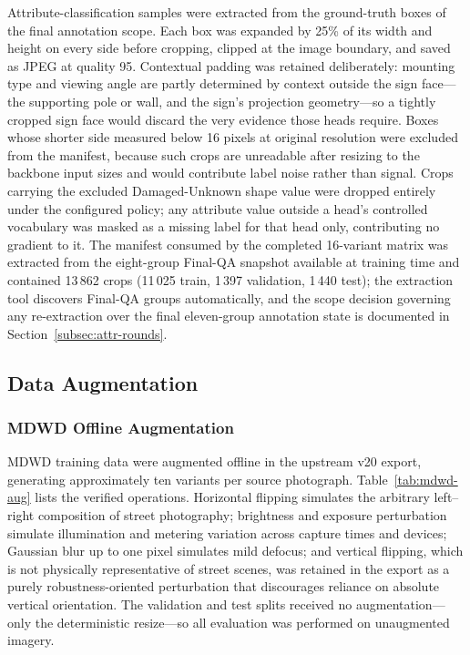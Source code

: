 Attribute-classification samples were extracted from the ground-truth boxes of the final annotation scope. Each box was expanded by 25\% of its width and height on every side before cropping, clipped at the image boundary, and saved as JPEG at quality 95. Contextual padding was retained deliberately: mounting type and viewing angle are partly determined by context outside the sign face---the supporting pole or wall, and the sign's projection geometry---so a tightly cropped sign face would discard the very evidence those heads require. Boxes whose shorter side measured below 16 pixels at original resolution were excluded from the manifest, because such crops are unreadable after resizing to the backbone input sizes and would contribute label noise rather than signal. Crops carrying the excluded Damaged-Unknown shape value were dropped entirely under the configured policy; any attribute value outside a head's controlled vocabulary was masked as a missing label for that head only, contributing no gradient to it. The manifest consumed by the completed 16-variant matrix was extracted from the eight-group Final-QA snapshot available at training time and contained 13\,862 crops (11\,025 train, 1\,397 validation, 1\,440 test); the extraction tool discovers Final-QA groups automatically, and the scope decision governing any re-extraction over the final eleven-group annotation state is documented in Section~\ref{subsec:attr-rounds}.

\subsection{Data Augmentation}
\label{subsec:augmentation}

\subsubsection{MDWD Offline Augmentation}

MDWD training data were augmented offline in the upstream v20 export, generating approximately ten variants per source photograph. Table~\ref{tab:mdwd-aug} lists the verified operations. Horizontal flipping simulates the arbitrary left--right composition of street photography; brightness and exposure perturbation simulate illumination and metering variation across capture times and devices; Gaussian blur up to one pixel simulates mild defocus; and vertical flipping, which is not physically representative of street scenes, was retained in the export as a purely robustness-oriented perturbation that discourages reliance on absolute vertical orientation. The validation and test splits received no augmentation---only the deterministic resize---so all evaluation was performed on unaugmented imagery.

